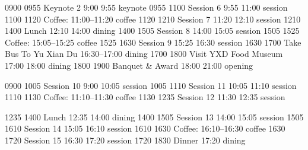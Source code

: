 \begin{timetable}
   {0900} {0955} {Keynote 2}                    {9:00}         {9:55} {keynote}
   {0955} {1100} {Session 6}               {9:55}      {11:00}     {session}
   {1100} {1120} {\vspace{0.1em}Coffee: {\scriptsize 11:00--11:20}}        {}     {} {coffee}
   {1120} {1210} {Session 7}               {11:20}      {12:10}     {session}
   {1210} {1400} {Lunch}                  {12:10}        {14:00}     {dining}
   {1400} {1505} {Session 8}               {14:00}      {15:05}     {session}
   {1505} {1525} {\vspace{0.1em}Coffee: {\scriptsize 15:05--15:25}}        {}     {} {coffee}
   {1525} {1630} {Session 9}               {15:25}      {16:30}     {session}
   {1630} {1700} {Take Bus To Yu Xian Du}                  {}        {\hspace{-2em}16:30--17:00}     {dining}
   {1700} {1800} {Visit YXD Food Museum}                  {17:00}        {18:00}     {dining}
   {1800} {1900} {Banquet \& Award}                  {18:00}        {21:00}     {opening}
  
   {0900} {1005} {Session 10}               {9:00}      {10:05}     {session}
   {1005} {1110} {Session 11}               {10:05}      {11:10}     {session}
   {1110} {1130} {\vspace{0.1em}Coffee: {\scriptsize 11:10--11:30}}        {}     {} {coffee}
   {1130} {1235} {Session 12}               {11:30}      {12:35}     {session}
  
   {1235} {1400} {Lunch}                  {12:35}        {14:00}     {dining}
   {1400} {1505} {Session 13}               {14:00}      {15:05}     {session}
   {1505} {1610} {Session 14}               {15:05}      {16:10}     {session}
   {1610} {1630} {\vspace{0.1em}Coffee: {\scriptsize 16:10--16:30}}        {}     {} {coffee}
   {1630} {1720} {Session 15}               {16:30}      {17:20}     {session}
   {1720} {1830} {Dinner}                  {17:20}        {}     {dining}
\end{timetable}



\newpage
\renewcommand{\arraystretch}{2}
{}

